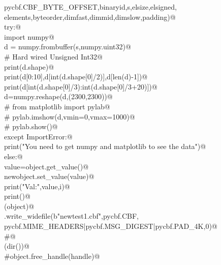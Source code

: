 \documentclass[10pt,a4paper,twoside,notitlepage]{article}
\begin{document}
\begin{flushleft}
\begin{minipage}{\linewidth}
\begin{list}{}{}
\mbox{}\verb@                  pycbf.CBF_BYTE_OFFSET,binaryid,s,elsize,elsigned,\@\\
\mbox{}\verb@                  elements,byteorder,dimfast,dimmid,dimslow,padding)@\\
\mbox{}\verb@                try:@\\
\mbox{}\verb@                   import numpy@\\
\mbox{}\verb@                   d = numpy.frombuffer(s,numpy.uint32)@\\
\mbox{}\verb@                   # Hard wired Unsigned Int32@\\
\mbox{}\verb@                   print(d.shape)@\\
\mbox{}\verb@                   print(d[0:10],d[int(d.shape[0]/2)],d[len(d)-1])@\\
\mbox{}\verb@                   print(d[int(d.shape[0]/3):int(d.shape[0]/3+20)])@\\
\mbox{}\verb@                   d=numpy.reshape(d,(2300,2300))@\\
\mbox{}\verb@#                   from matplotlib import pylab@\\
\mbox{}\verb@#                   pylab.imshow(d,vmin=0,vmax=1000)@\\
\mbox{}\verb@#                   pylab.show()@\\
\mbox{}\verb@                except ImportError:@\\
\mbox{}\verb@                   print("You need to get numpy and matplotlib to see the data")@\\
\mbox{}\verb@            else:@\\
\mbox{}\verb@                value=object.get_value()@\\
\mbox{}\verb@                newobject.set_value(value)@\\
\mbox{}\verb@                print("Val:",value,i)@\\
\mbox{}\verb@    print()@\\
\mbox{}\verb@del(object)@\\
\mbox{}\verb@newobject.write_widefile(b"newtest1.cbf",pycbf.CBF,\@\\
\mbox{}\verb@    pycbf.MIME_HEADERS|pycbf.MSG_DIGEST|pycbf.PAD_4K,0)@\\
\mbox{}\verb@#@\\
\mbox{}\verb@print(dir())@\\
\mbox{}\verb@#object.free_handle(handle)@\\
\mbox{}\verb@@{\NWsep}
\end{list}
\vspace{-1.5ex}
\footnotesize
\begin{list}{}{\setlength{\itemsep}{-\parsep}\setlength{\itemindent}{-\leftmargin}}

\item{}
\end{list}
\end{minipage}\vspace{4ex}
\end{flushleft}
\end{document}
